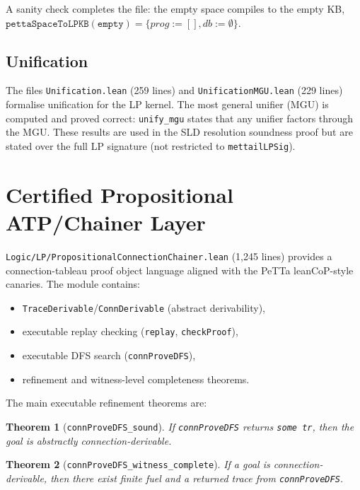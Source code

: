 \documentclass[]{article}
\newtheorem{theorem}{Theorem}
\newcommand{\code}[1]{\texttt{#1}}
\newcommand{\PeTTa}{\textup{PeTTa}}
\begin{document}
A sanity check completes the file: the empty space compiles to the empty KB,
$\code{pettaSpaceToLPKB}(\code{empty}) = \{prog := [], db := \emptyset\}$.

\subsection{Unification}

The files \code{Unification.lean} (259 lines) and \code{UnificationMGU.lean}
(229 lines) formalise unification for the LP kernel.  The most general unifier (MGU)
is computed and proved correct: \code{unify\_mgu} states that any unifier factors
through the MGU.  These results are used in the SLD resolution soundness proof
but are stated over the full LP signature (not restricted to \code{mettailLPSig}).

\section{Certified Propositional ATP/Chainer Layer}
\label{sec:chainer}

\code{Logic/LP/PropositionalConnectionChainer.lean} (1{,}245 lines) provides a
connection-tableau proof object language aligned with the \PeTTa{} leanCoP-style
canaries.  The module contains:
\begin{itemize}
\item \code{TraceDerivable}/\code{ConnDerivable} (abstract derivability),
\item executable replay checking (\code{replay}, \code{checkProof}),
\item executable DFS search (\code{connProveDFS}),
\item refinement and witness-level completeness theorems.
\end{itemize}

The main executable refinement theorems are:

\begin{theorem}[\code{connProveDFS\_sound}]
\label{thm:connsound}
If \code{connProveDFS} returns \code{some tr}, then the goal is abstractly
connection-derivable.
\end{theorem}

\begin{theorem}[\code{connProveDFS\_witness\_complete}]
\label{thm:conncomplete}
If a goal is connection-derivable, then there exist finite fuel and a returned
trace from \code{connProveDFS}.
\end{theorem}
\end{document}
